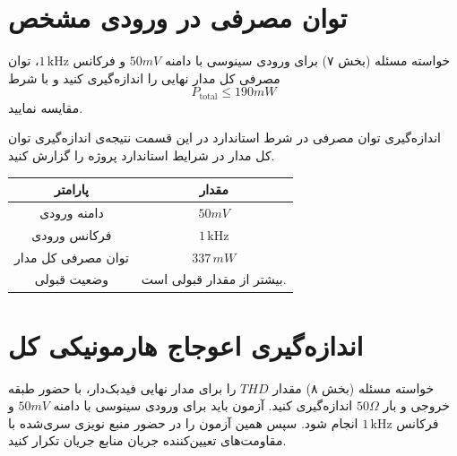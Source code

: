 \documentclass[12pt,a4paper]{article}
\begin{document}
\newpage

\section{توان مصرفی در ورودی مشخص}

\begin{taskbox}{خواسته مسئله (بخش ۷)}
برای ورودی سینوسی با دامنه $50mV$ و فرکانس $1\,\text{kHz}$، توان مصرفی کل مدار نهایی را اندازه‌گیری کنید و با شرط
$$P_{\text{total}} \le 190mW$$
مقایسه نمایید.
\end{taskbox}

\begin{answerbox}{اندازه‌گیری توان مصرفی در شرط استاندارد}
در این قسمت نتیجه‌ی اندازه‌گیری توان کل مدار در شرایط استاندارد پروژه را گزارش کنید.

\begin{center}
\begin{tabular}{|c|c|}
\hline
\textbf{پارامتر} & \textbf{مقدار} \\
\hline
دامنه ورودی & $50mV$ \\
\hline
فرکانس ورودی & $1\,\text{kHz}$ \\
\hline
توان مصرفی کل مدار & $337 \, mW$\\
\hline
وضعیت قبولی &بیشتر از مقدار قبولی است. \\
\hline
\end{tabular}
\end{center}

\vspace{5cm}
\end{answerbox}

\newpage

\section{اندازه‌گیری اعوجاج هارمونیکی کل }

\begin{taskbox}{خواسته مسئله (بخش ۸)}
مقدار $THD$ را برای مدار نهایی فیدبک‌دار، با حضور طبقه خروجی و بار $50\Omega$ اندازه‌گیری کنید. آزمون باید برای ورودی سینوسی با دامنه $50mV$ و فرکانس $1\,\text{kHz}$ انجام شود. سپس همین آزمون را در حضور منبع نویزی سری‌شده با مقاومت‌های تعیین‌کننده جریان منابع جریان تکرار کنید.
\end{taskbox}
\end{document}
